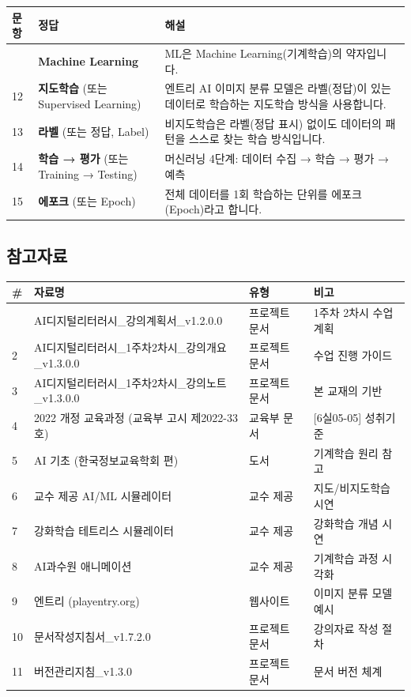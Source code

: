 \documentclass[a4paper, 11pt]{article}
\begin{document}
\begin{longtable}{p{4.5cm}p{4.5cm}p{5.0cm}}
\toprule\noalign{}
\textbf{문항} & \textbf{정답} & \textbf{해설} \\
\midrule\noalign{}
\endhead
\bottomrule\noalign{}
\endlastfoot
11 & \textbf{Machine Learning} & ML은 Machine Learning(기계학습)의
약자입니다. \\
12 & \textbf{지도학습} (또는 Supervised Learning) & 엔트리 AI 이미지
분류 모델은 라벨(정답)이 있는 데이터로 학습하는 지도학습 방식을
사용합니다. \\
13 & \textbf{라벨} (또는 정답, Label) & 비지도학습은 라벨(정답 표시)
없이도 데이터의 패턴을 스스로 찾는 학습 방식입니다. \\
14 & \textbf{학습 → 평가} (또는 Training → Testing) & 머신러닝 4단계:
데이터 수집 → 학습 → 평가 → 예측 \\
15 & \textbf{에포크} (또는 Epoch) & 전체 데이터를 1회 학습하는 단위를
에포크(Epoch)라고 합니다. \\
\end{longtable}

\hypertarget{uxcc38uxace0uxc790uxb8cc}{%
\subsection{참고자료}\label{uxcc38uxace0uxc790uxb8cc}}

\begin{longtable}{p{2.5cm}p{3.5cm}p{4.0cm}p{4.0cm}}
\toprule\noalign{}
\textbf{\#} & \textbf{자료명} & \textbf{유형} & \textbf{비고} \\
\midrule\noalign{}
\endhead
\bottomrule\noalign{}
\endlastfoot
1 & AI디지털리터러시\_강의계획서\_v1.2.0.0 & 프로젝트 문서 & 1주차 2차시
수업 계획 \\
2 & AI디지털리터러시\_1주차2차시\_강의개요\_v1.3.0.0 & 프로젝트 문서 &
수업 진행 가이드 \\
3 & AI디지털리터러시\_1주차2차시\_강의노트\_v1.3.0.0 & 프로젝트 문서 &
본 교재의 기반 \\
4 & 2022 개정 교육과정 (교육부 고시 제2022-33호) & 교육부 문서 &
{[}6실05-05{]} 성취기준 \\
5 & AI 기초 (한국정보교육학회 편) & 도서 & 기계학습 원리 참고 \\
6 & 교수 제공 AI/ML 시뮬레이터 & 교수 제공 & 지도/비지도학습 시연 \\
7 & 강화학습 테트리스 시뮬레이터 & 교수 제공 & 강화학습 개념 시연 \\
8 & AI과수원 애니메이션 & 교수 제공 & 기계학습 과정 시각화 \\
9 & 엔트리 (playentry.org) & 웹사이트 & 이미지 분류 모델 예시 \\
10 & 문서작성지침서\_v1.7.2.0 & 프로젝트 문서 & 강의자료 작성 절차 \\
11 & 버전관리지침\_v1.3.0 & 프로젝트 문서 & 문서 버전 체계 \\
\end{longtable}
\end{document}
